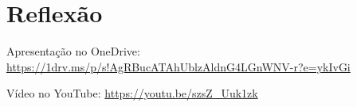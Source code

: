 \section{Reflexão}


Apresentação no OneDrive: \url{https://1drv.ms/p/s!AgRBucATAhUblzAldnG4LGnWNV-r?e=ykIvGi} \\
\begin{center}
    \href{https://1drv.ms/p/s!AgRBucATAhUblzAldnG4LGnWNV-r?e=ykIvGi}{
    }
\end{center}


Vídeo no YouTube: \url{https://youtu.be/szsZ_Uuk1zk} \\
\begin{center}
    \href{https://youtu.be/szsZ_Uuk1zk}{
    }
\end{center}
